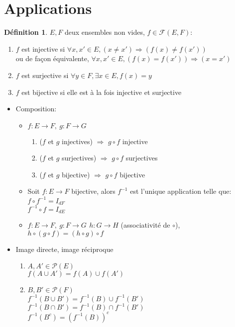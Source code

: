 \documentclass[fleqn]{article}
\theoremstyle{definition} \newtheorem*{defi}{D\'efinition}
\theoremstyle{plain} \newtheorem*{theo}{Th\'eor\`eme}
\begin{document}
\section{Applications}
\begin{defi}
	\(E, F\) deux ensembles non vides, \( f \in \mathcal{F}(E, F)\):
	\begin{enumerate}
		\item \(f\) est injective si \(\forall x,x' \in E, (x \neq x') \Rightarrow (f(x) \neq f(x'))\) \\
		ou de fa\c{c}on \'equivalente, \(\forall x,x' \in E, (f(x) = f(x')) \Rightarrow (x = x')\)
		\item \(f\) est surjective si \(\forall y \in F, \exists x \in E, f(x) = y\)
		\item \(f\) est bijective si elle est \`a la fois injective et surjective
	\end{enumerate}
\end{defi}
\begin{itemize}
	\item Composition:
		\begin{itemize}
			\item \(f: E \rightarrow F,\ g: F \rightarrow G\)
				\begin{enumerate}
					\item (\(f\) et \(g\) injectives) \(\Rightarrow\) \(g \circ f\) injective
					\item (\(f\) et \(g\) surjectives) \(\Rightarrow\) \(g \circ f\) surjectives
					\item (\(f\) et \(g\) bijective) \(\Rightarrow\) \(g \circ f\) bijective
				\end{enumerate}
			\item Soit \(f: E \rightarrow F\) bijective, alors \(f^{-1}\) est l'unique application telle que: \\
				\(f \circ f^{-1} = I_{dF}\) \\
				\(f^{-1} \circ f = I_{dE}\)
			\item \(f: E \rightarrow F,\ g: F \rightarrow G\,\ h: G \rightarrow H\) (associativit\'e de \(\circ\)), \\
				\(h \circ (g \circ f) = (h \circ g) \circ f\)
		\end{itemize}
	\item Image directe, image r\'eciproque
		\begin{enumerate}
			\item \(A, A' \in \mathcal{P}(E)\) \\
				\(f(A \cup A') = f(A) \cup f(A')\)
			\item \(B, B' \in \mathcal{P}(F)\) \\
				\(f^{-1}(B \cup B') = f^{-1}(B) \cup f^{-1}(B')\) \\
				\(f^{-1}(B \cap B') = f^{-1}(B) \cap f^{-1}(B')\) \\
				\(f^{-1}(B^c) = (f^{-1}(B))^c\)
		\end{enumerate}
\end{itemize}
\end{document}
